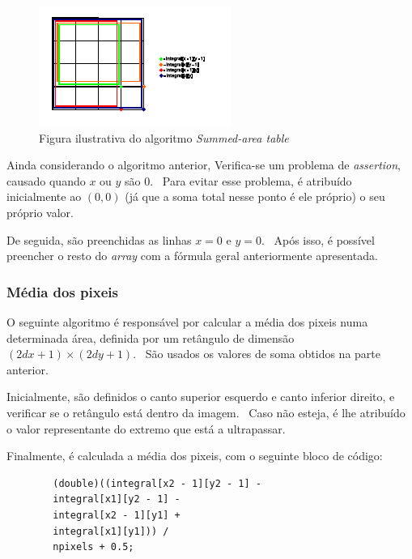    \begin{figure} [H]
        \centering
        \includegraphics[scale=3]{images/sumareas.pdf}
        \caption{Figura ilustrativa do algoritmo \textit{Summed-area table}} 
    \end{figure}

    \newpage

    \par Ainda considerando o algoritmo anterior, Verifica-se um problema de \textit{assertion}, causado quando $x$ ou $y$ são 0. \ Para evitar esse problema, é atribuído inicialmente ao $(0,0)$ (já que a soma total nesse ponto é ele próprio) o seu próprio valor.

    \par De seguida, são preenchidas as linhas $x = 0$ e $y = 0$. \ Após isso, é possível preencher o resto do \textit{array} com a fórmula geral anteriormente apresentada.

\subsubsection{Média dos pixeis}
    \par O seguinte algoritmo é responsável por calcular a média dos pixeis numa determinada área, definida por um retângulo de dimensão $(2dx + 1) \times (2dy + 1)$. \ São usados os valores de soma obtidos na parte anterior.

    \par Inicialmente, são definidos o canto superior esquerdo e canto inferior direito, e verificar se o retângulo está dentro da imagem. \ Caso não esteja, é lhe atribuído o valor representante do extremo que está a ultrapassar.

    \par Finalmente, é calculada a média dos pixeis, com o seguinte bloco de código:

    \begin{lstlisting}
        (double)((integral[x2 - 1][y2 - 1] -
        integral[x1][y2 - 1] -
        integral[x2 - 1][y1] +
        integral[x1][y1])) /
        npixels + 0.5;
    \end{lstlisting}

